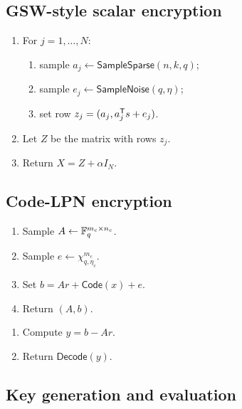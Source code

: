 \subsection{GSW-style scalar encryption}

\begin{algobox}
\begin{enumerate}
    \item For $j=1,\ldots,N$:
    \begin{enumerate}
        \item sample $a_j\leftarrow\mathsf{SampleSparse}(n,k,q)$;
        \item sample $e_j\leftarrow\mathsf{SampleNoise}(q,\eta)$;
        \item set row $z_j=(a_j,a_j^{\mathsf T} s+e_j)$.
    \end{enumerate}
    \item Let $Z$ be the matrix with rows $z_j$.
    \item Return $X=Z+\alpha I_N$.
\end{enumerate}
\end{algobox}

\subsection{Code-LPN encryption}

\begin{algobox}
\begin{enumerate}
    \item Sample $A\leftarrow\mathbb{F}_q^{m_c\times n_c}$.
    \item Sample $e\leftarrow\chi_{q,\eta_c}^{m_c}$.
    \item Set $b=Ar+\mathsf{Code}(x)+e$.
    \item Return $(A,b)$.
\end{enumerate}
\end{algobox}

\begin{algobox}
\begin{enumerate}
    \item Compute $y=b-Ar$.
    \item Return $\mathsf{Decode}(y)$.
\end{enumerate}
\end{algobox}

\subsection{Key generation and evaluation}

